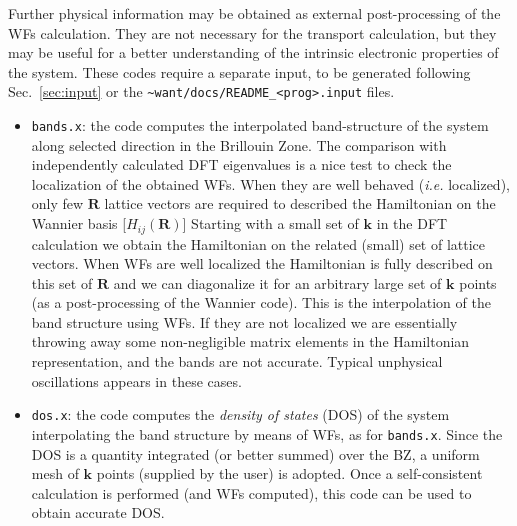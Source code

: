 %
%

\noindent
Further physical information may be obtained as external
post-processing of the WFs calculation. They are not necessary for
the transport calculation, but they may be useful for a
better understanding of the intrinsic electronic properties of the
system. These codes require a separate input, to be generated
following Sec.~\ref{sec:input} or the
{\tt \~{}want/docs/README\_<prog>.input} files.

%
%
\begin{itemize}
%
\item {\tt bands.x}: the code computes the interpolated band-structure
      of the system along selected direction in the Brillouin Zone.
      The comparison with independently calculated DFT eigenvalues is
      a nice test to check the localization of the obtained WFs.
      When they are well behaved ({\it i.e.} localized), only few $\mathbf{R}$ lattice
      vectors are required to described the Hamiltonian on the Wannier basis
      [$H_{ij}(\mathbf{R})$]
      Starting with a small set of $\mathbf{k}$ in the DFT calculation
      we obtain the Hamiltonian on the related (small) set of lattice vectors.
      When WFs are well localized
      the Hamiltonian is fully described on this set of $\mathbf{R}$ and we can
      diagonalize it for an arbitrary large set of $\mathbf{k}$ points
      (as a post-processing of the Wannier code). This is the
      interpolation of the band structure using WFs. If they are not localized
      we are essentially throwing away some non-negligible matrix elements
      in the Hamiltonian representation, and the bands
      are not accurate. Typical unphysical oscillations appears in these cases.

\item {\tt dos.x}: the code computes the {\it density of states} (DOS) 
      of the system interpolating the band structure by means of WFs, as
      for {\tt bands.x}. Since the DOS is a quantity integrated (or better summed)
      over the BZ, a uniform mesh of $\mathbf{k}$ points (supplied by the user)
      is adopted.
      Once a self-consistent calculation is performed (and WFs computed), this code can be 
      used to obtain accurate DOS. 


\end{itemize}
